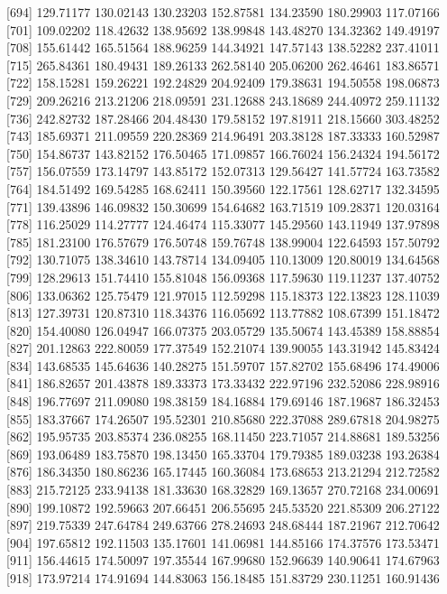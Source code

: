 \documentclass[
  10pt,
  a4paper,oneside]{article}
\begin{document}
{[}694{]} 129.71177 130.02143 130.23203 152.87581 134.23590 180.29903 117.07166
{[}701{]} 109.02202 118.42632 138.95692 138.99848 143.48270 134.32362 149.49197
{[}708{]} 155.61442 165.51564 188.96259 144.34921 147.57143 138.52282 237.41011
{[}715{]} 265.84361 180.49431 189.26133 262.58140 205.06200 262.46461 183.86571
{[}722{]} 158.15281 159.26221 192.24829 204.92409 179.38631 194.50558 198.06873
{[}729{]} 209.26216 213.21206 218.09591 231.12688 243.18689 244.40972 259.11132
{[}736{]} 242.82732 187.28466 204.48430 179.58152 197.81911 218.15660 303.48252
{[}743{]} 185.69371 211.09559 220.28369 214.96491 203.38128 187.33333 160.52987
{[}750{]} 154.86737 143.82152 176.50465 171.09857 166.76024 156.24324 194.56172
{[}757{]} 156.07559 173.14797 143.85172 152.07313 129.56427 141.57724 163.73582
{[}764{]} 184.51492 169.54285 168.62411 150.39560 122.17561 128.62717 132.34595
{[}771{]} 139.43896 146.09832 150.30699 154.64682 163.71519 109.28371 120.03164
{[}778{]} 116.25029 114.27777 124.46474 115.33077 145.29560 143.11949 137.97898
{[}785{]} 181.23100 176.57679 176.50748 159.76748 138.99004 122.64593 157.50792
{[}792{]} 130.71075 138.34610 143.78714 134.09405 110.13009 120.80019 134.64568
{[}799{]} 128.29613 151.74410 155.81048 156.09368 117.59630 119.11237 137.40752
{[}806{]} 133.06362 125.75479 121.97015 112.59298 115.18373 122.13823 128.11039
{[}813{]} 127.39731 120.87310 118.34376 116.05692 113.77882 108.67399 151.18472
{[}820{]} 154.40080 126.04947 166.07375 203.05729 135.50674 143.45389 158.88854
{[}827{]} 201.12863 222.80059 177.37549 152.21074 139.90055 143.31942 145.83424
{[}834{]} 143.68535 145.64636 140.28275 151.59707 157.82702 155.68496 174.49006
{[}841{]} 186.82657 201.43878 189.33373 173.33432 222.97196 232.52086 228.98916
{[}848{]} 196.77697 211.09080 198.38159 184.16884 179.69146 187.19687 186.32453
{[}855{]} 183.37667 174.26507 195.52301 210.85680 222.37088 289.67818 204.98275
{[}862{]} 195.95735 203.85374 236.08255 168.11450 223.71057 214.88681 189.53256
{[}869{]} 193.06489 183.75870 198.13450 165.33704 179.79385 189.03238 193.26384
{[}876{]} 186.34350 180.86236 165.17445 160.36084 173.68653 213.21294 212.72582
{[}883{]} 215.72125 233.94138 181.33630 168.32829 169.13657 270.72168 234.00691
{[}890{]} 199.10872 192.59663 207.66451 206.55695 245.53520 221.85309 206.27122
{[}897{]} 219.75339 247.64784 249.63766 278.24693 248.68444 187.21967 212.70642
{[}904{]} 197.65812 192.11503 135.17601 141.06981 144.85166 174.37576 173.53471
{[}911{]} 156.44615 174.50097 197.35544 167.99680 152.96639 140.90641 174.67963
{[}918{]} 173.97214 174.91694 144.83063 156.18485 151.83729 230.11251 160.91436
\end{document}
